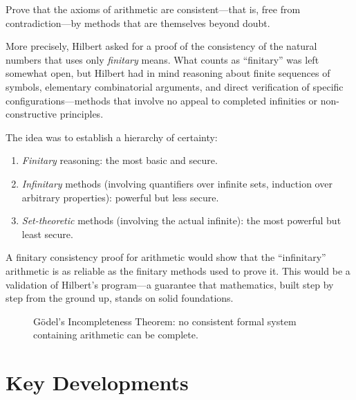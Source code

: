 \begin{problem_statement}
Prove that the axioms of arithmetic are consistent---that is, free from contradiction---by methods that are themselves beyond doubt.
\end{problem_statement}

More precisely, Hilbert asked for a proof of the consistency of the natural numbers that uses only \emph{finitary} means. What counts as ``finitary'' was left somewhat open, but Hilbert had in mind reasoning about finite sequences of symbols, elementary combinatorial arguments, and direct verification of specific configurations---methods that involve no appeal to completed infinities or non-constructive principles.

The idea was to establish a hierarchy of certainty:
\begin{enumerate}
    \item \emph{Finitary} reasoning: the most basic and secure.
    \item \emph{Infinitary} methods (involving quantifiers over infinite sets, induction over arbitrary properties): powerful but less secure.
    \item \emph{Set-theoretic} methods (involving the actual infinite): the most powerful but least secure.
\end{enumerate}

A finitary consistency proof for arithmetic would show that the ``infinitary'' arithmetic is as reliable as the finitary methods used to prove it. This would be a validation of Hilbert's program---a guarantee that mathematics, built step by step from the ground up, stands on solid foundations.

\begin{figure}[htbp]
\centering
{}
\caption{Gödel's Incompleteness Theorem: no consistent formal system containing arithmetic can be complete.}
\label{fig:godel-incompleteness}
\end{figure}

\section{Key Developments}

